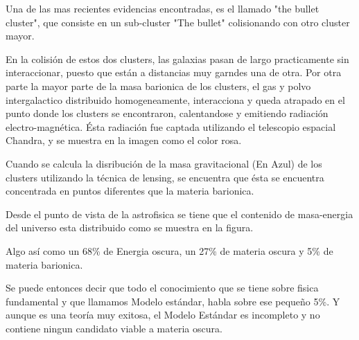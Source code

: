 \documentclass[12pt,letterpaper]{article}
\newcounter{example}[enumi]
\begin{document}
	\begin{tcolorbox}[title= Slide \arabic{example}]
	Una de las mas recientes evidencias encontradas, es el llamado "the bullet cluster", que consiste en un sub-cluster "The bullet" colisionando con otro cluster mayor. 
	
	En la colisión de estos dos clusters, las galaxias pasan de largo practicamente sin interaccionar, puesto que están a distancias muy garndes una de otra. Por otra parte la mayor parte de la masa barionica de los clusters, el gas y polvo intergalactico distribuido homogeneamente, interacciona y queda atrapado en el punto donde los clusters se encontraron, calentandose y emitiendo radiación electro-magnética. Ésta radiación fue captada utilizando el telescopio espacial Chandra, y se muestra en la imagen como el color rosa. 
	
	Cuando se calcula la disribución de la masa gravitacional (En Azul) de los clusters utilizando la técnica de lensing, se encuentra que ésta se encuentra concentrada en puntos diferentes que la materia barionica.
	
	\end{tcolorbox}

	\begin{tcolorbox}[title= Slide \arabic{example}]
	
	Desde el punto de vista de la astrofisica se tiene que el contenido de masa-energia del universo esta distribuido como se muestra en la figura.
	
	Algo así como un 68\% de Energia oscura, un 27\% de materia oscura y 5\% de materia barionica.
		
	Se puede entonces decir que todo el conocimiento que se tiene sobre fisica fundamental y que llamamos Modelo estándar, habla sobre ese pequeño 5\%. Y aunque es una teoría muy exitosa, el Modelo Estándar es incompleto y no contiene ningun candidato viable a materia oscura. 
	
	
	
	

	\end{tcolorbox}
\end{document}
